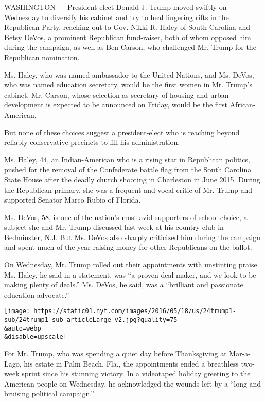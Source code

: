 WASHINGTON --- President-elect Donald J. Trump moved swiftly on
Wednesday to diversify his cabinet and try to heal lingering rifts in
the Republican Party, reaching out to Gov. Nikki R. Haley of South
Carolina and Betsy DeVos, a prominent Republican fund-raiser, both of
whom opposed him during the campaign, as well as Ben Carson, who
challenged Mr. Trump for the Republican nomination.

Ms. Haley, who was named ambassador to the United Nations, and Ms.
DeVos, who was named education secretary, would be the first women in
Mr. Trump's cabinet. Mr. Carson, whose selection as secretary of housing
and urban development is expected to be announced on Friday, would be
the first African-American.

But none of these choices suggest a president-elect who is reaching
beyond reliably conservative precincts to fill his administration.

Ms. Haley, 44, an Indian-American who is a rising star in Republican
politics, pushed for the
\href{http://www.nytimes.com/2015/07/10/us/confederate-flag-south-carolina.html}{removal
of the Confederate battle flag} from the South Carolina State House
after the deadly church shooting in Charleston in June 2015. During the
Republican primary, she was a frequent and vocal critic of Mr. Trump and
supported Senator Marco Rubio of Florida.

Ms. DeVos, 58, is one of the nation's most avid supporters of school
choice, a subject she and Mr. Trump discussed last week at his country
club in Bedminster, N.J. But Ms. DeVos also sharply criticized him
during the campaign and spent much of the year raising money for other
Republicans on the ballot.

On Wednesday, Mr. Trump rolled out their appointments with unstinting
praise. Ms. Haley, he said in a statement, was ``a proven deal maker,
and we look to be making plenty of deals.'' Ms. DeVos, he said, was a
``brilliant and passionate education advocate.''

\texttt{[image: https://static01.nyt.com/images/2016/05/18/us/24trump1-sub/24trump1-sub-articleLarge-v2.jpg?quality=75\\\&auto=webp\\\&disable=upscale]}

For Mr. Trump, who was spending a quiet day before Thanksgiving at
Mar-a-Lago, his estate in Palm Beach, Fla., the appointments ended a
breathless two-week sprint since his stunning victory. In a videotaped
holiday greeting to the American people on Wednesday, he acknowledged
the wounds left by a ``long and bruising political campaign.''

